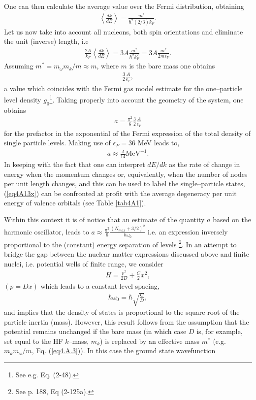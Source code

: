 One can then calculate the average value over the Fermi distribution, obtaining
\begin{align}
\left\langle\frac{dk}{dE}\right\rangle=\frac{m^*}{\hbar^2(2/3)k_F}.
\end{align}
 Let us now take into account all nucleons, both spin orientations and eliminate the unit (inverse) length, i.e
\begin{align}
\frac{2A}{k_F}\left\langle\frac{dk}{dE}\right\rangle=3A\frac{m^*}{\hbar^2k_F^2}=3A\frac{m^*}{2m\epsilon_F}.
\end{align}
Assuming $m^*=m_\omega m_k/m\approx m$, where $m$ is the bare mass one obtains
\begin{align}
\frac{3}{2}\frac{A}{\epsilon_F},
\end{align}
a value which coincides with the Fermi gas model estimate for the one--particle level density $g_0$\footnote{See e.g. \cite{Bohr:69} Eq. (2-48).}. Taking properly into account the geometry of the system, one obtains
\begin{align}\label{eq4A13}
a=\frac{\pi^2}{6}\frac{3}{2}\frac{A}{\epsilon_F}
\end{align}
for the prefactor in the exponential of the Fermi expression of the total density of single particle levels. Making use of $\epsilon_F=36$ MeV leads to,
\begin{align}\label{eq4A13x}
a\approx\frac{A}{14}\text{MeV}^{-1}.
\end{align}
In keeping with the fact that one can interpret $dE/dk$ as the rate of change in energy when the momentum changes or, equivalently, when the number of nodes per unit length changes, and this can be used to label the single--particle states, (\ref{eq4A13x}) can be confronted at profit with the average degeneracy per unit energy of valence orbitals (see Table \ref{tab4A1}). 



Within this context it is of notice that an estimate of the quantity $a$ based on the harmonic oscillator, leads to $a\approx\frac{\pi^2}{6}\frac{(N_{max}+3/2)^2}{\hbar\omega_0}$ i.e. an expression inversely proportional to the (constant) energy separation of levels \footnote{See \cite{Bohr:69} p. 188, Eq (2-125a).}. In an attempt to bridge the gap between the nuclear matter expressions discussed above and finite nuclei, i.e. potential wells of finite range, we consider
\begin{align}\label{eq4A14}
H=\frac{p^2}{2D}+\frac{C}{2}x^2,
\end{align}
$(p=D\dot x)$ which leads to a constant level spacing,
\begin{align}
\hbar\omega_0=\hbar\sqrt{\frac{C}{D}},
\end{align}
 and implies that the density of states is proportional to the square root of the particle inertia (mass). However, this result follows from the assumption that the potential remains unchanged if the bare mass (in which case $D$ is, for example, set equal to the HF $k$--mass, $m_k$) is replaced by an effective mass $m^*$ (e.g. $m_km_\omega/m$, Eq. (\ref{eq4.A.3})). In this case the ground state wavefunction
 

